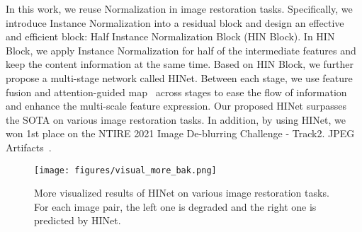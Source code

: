 \documentclass[final]{cvpr}
\begin{document}
In this work, we reuse Normalization in image restoration tasks. Specifically, we introduce Instance Normalization into a residual block and design an effective and efficient block: Half Instance Normalization Block (HIN Block). In HIN Block, we apply Instance Normalization for half of the intermediate features and keep the content information at the same time. Based on HIN Block, we further propose a multi-stage network called HINet. Between each stage, we use feature fusion and attention-guided map~\cite{zamir2021multi} across stages to ease the flow of information and enhance the multi-scale feature expression. Our proposed HINet surpasses the SOTA on various image restoration tasks. In addition, by using HINet, we won 1st place on the NTIRE 2021 Image De-blurring Challenge - Track2. JPEG Artifacts~\cite{nah2021ntire}.

\begin{figure*}[t]
    \centering
    \texttt{[image: figures/visual\_more\_bak.png]}
    \caption{More visualized results of HINet on various image restoration tasks. For each image pair, the left one is degraded and the right one is predicted by HINet.}
    \label{fig:visual_more}
\end{figure*}


\clearpage
{\small


}
\end{document}
